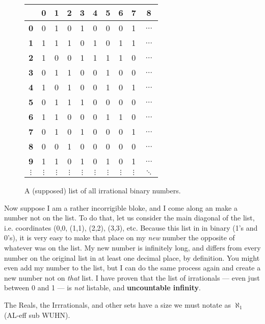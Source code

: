 \begin{figure}
\begin{center}
  \begin{tabular}{ c | c c c c c c c c c  }
    \hline
    		& \textbf{0} & \textbf{1} & \textbf{2} & \textbf{3} & \textbf{4} & \textbf{5} & \textbf{6} & \textbf{7} & \textbf{8} \\ \hline 
    \textbf{0} & 0 & 1 & 0 & 1 & 0 & 0 & 0 & 1 & $\dots$ \\ 
    \textbf{1} & 1 & 1 & 1 & 0 & 1 & 0 & 1 & 1 & $\dots$ \\ 
    \textbf{2} & 1 & 0 & 0 & 1 & 1 & 1 & 1 & 0 & $\dots$ \\
    \textbf{3} & 0 & 1 & 1 & 0 & 0 & 1 & 0 & 0 & $\dots$ \\ 
    \textbf{4} & 1 & 0 & 1 & 0 & 0 & 1 & 0 & 1 & $\dots$ \\
    \textbf{5} & 0 & 1 & 1 & 1 & 0 & 0 & 0 & 0 & $\dots$ \\ 
    \textbf{6} & 1 & 1 & 0 & 0 & 0 & 1 & 1 & 0 & $\dots$ \\
    \textbf{7} & 0 & 1 & 0 & 1 & 0 & 0 & 0 & 1 & $\dots$ \\ 
    \textbf{8} & 0 & 0 & 1 & 0 & 0 & 0 & 0 & 0 & $\dots$ \\
    \textbf{9} & 1 & 1 & 0 & 1 & 0 & 1 & 0 & 1 & $\dots$ \\ 
    $\vdots$ & $\vdots$ & $\vdots$ & $\vdots$ & $\vdots$ & $\vdots$ & $\vdots$ & $\vdots$ & $\vdots$ & $\ddots$ \\
  \end{tabular}
\caption{A (supposed) list of all irrational binary numbers.}
\end{center}
\end{figure}

Now suppose I am a rather incorrigible bloke, and I come along an make a
number not on the list.  To do that, let us consider the main diagonal of the
list, i.e. coordinates (0,0, (1,1), (2,2), (3,3), etc.  Because this list in in binary 
(1's and 0's), it is very easy to make that place on my \emph{new} number
the opposite of whatever was on the list.  My new number is infinitely long, and
differs from every number on the original list in at least one decimal place, by
definition.  You might even add my number to the list, but I can do the same
process again and create a new number not on \emph{that} list.  I have
proven that the list of irrationals --- even just between 0 and 1 --- is \emph{not}
listable, and \textbf{uncountable infinity}.

The Reals, the Irrrationals, and other sets have a size we must notate as
$\aleph_1$ (AL-eff sub WUHN).




